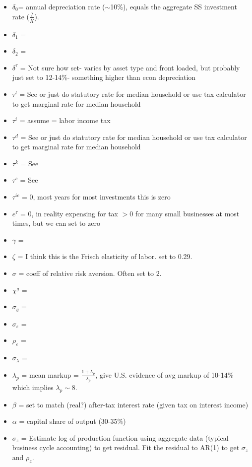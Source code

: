\documentclass[article,11pt,letterpaper,fleqn]{article}
\theoremstyle{definition}
\numberwithin{equation}{section}
\newcommand{\cn}{\citeasnoun} %
\newcommand\ve{\varepsilon}
\begin{document}
{\begin{itemize}
\item $\delta_{0}$= annual depreciation rate ($\sim$10\%), equals the aggregate SS investment rate ($\frac{\bar{I}}{\bar{K}}$).
\item $\delta_{1}$ =
\item $\delta_{2}$ =
\item $\delta^{\tau}$ = Not sure how set- varies by asset type and front loaded, but probably just set to 12-14\%- something higher than econ depreciation
\item $\tau^{l}$ = See \cn{Jones2002} or just do statutory rate for median household or use tax calculator to get marginal rate for median household
\item $\tau^{i}$ = assume = labor income tax
\item $\tau^{d}$ = See \cn{Jones2002} or just do statutory rate for median household or use tax calculator to get marginal rate for median household
\item $\tau^{k}$ = See \cn{Jones2002}
\item $\tau^{c}$ = See \cn{Jones2002}
\item $\tau^{ic}$ = 0, most years for most investments this is zero
\item $e^{\tau}$ = 0, in reality expensing for tax $> 0$ for many small businesses at most times, but we can set to zero
\item $\gamma$ =
\item $\zeta$ = I think this is the Frisch elasticity of labor.  \cn{CER2010} set to 0.29.
\item $\sigma$ = coeff of relative risk aversion.  Often set to 2.
\item $\chi^{g}$ =
\item $\sigma_{g}$ =
\item $\sigma_{\ve}$ =
\item $\rho_{\ve}$ =
\item $\sigma_{\lambda}$ =
\item $\lambda_{p}$ = mean markup = $\frac{1+\lambda_{p}}{\lambda_{p}}$, \cn{BF1995} give U.S. evidence of avg markup of 10-14\% which implies $\lambda_{p}\sim 8$.
\item $\beta$ = set to match (real?) after-tax interest rate (given tax on interest income)
\item $\alpha$ = capital share of output (30-35\%)
\item $\sigma_{z}$ = Estimate log of production function using aggregate data (typical business cycle accounting) to get residual.  Fit the residual to AR(1) to get $\sigma_{z}$ and $\rho_{z}$.

\end{itemize}}
\end{document}
